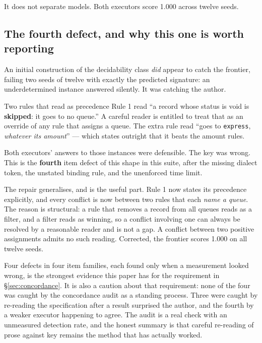 \documentclass[11pt]{article}
\theoremstyle{definition}
\begin{document}
It does not separate models. Both executors score 1.000 across twelve seeds.

\subsection{The fourth defect, and why this one is worth reporting}\label{sec:fourth}

An initial construction of the decidability class \emph{did} appear to catch the frontier, failing two seeds of twelve with exactly the predicted signature: an underdetermined instance answered silently. It was catching the author.

\begin{cautionbox}{Two rules that read as precedence}
Rule 1 read ``a record whose status is void is \textbf{skipped}: it goes to no queue.'' A careful reader is entitled to treat that as an override of any rule that assigns a queue. The extra rule read ``goes to \texttt{express}, \emph{whatever its amount}'' --- which states outright that it beats the amount rules.

Both executors' answers to those instances were defensible. The key was wrong. This is the \textbf{fourth} item defect of this shape in this suite, after the missing dialect token, the unstated binding rule, and the unenforced time limit.
\end{cautionbox}

The repair generalises, and is the useful part. Rule 1 now states its precedence explicitly, and every conflict is now between two rules that each \emph{name a queue}. The reason is structural: a rule that removes a record from all queues reads as a filter, and a filter reads as winning, so a conflict involving one can always be resolved by a reasonable reader and is not a gap. A conflict between two positive assignments admits no such reading. Corrected, the frontier scores 1.000 on all twelve seeds.

Four defects in four item families, each found only when a measurement looked wrong, is the strongest evidence this paper has for the requirement in \S\ref{sec:concordance}. It is also a caution about that requirement: none of the four was caught by the concordance audit as a standing process. Three were caught by re-reading the specification after a result surprised the author, and the fourth by a weaker executor happening to agree. The audit is a real check with an unmeasured detection rate, and the honest summary is that careful re-reading of prose against key remains the method that has actually worked.
\end{document}
